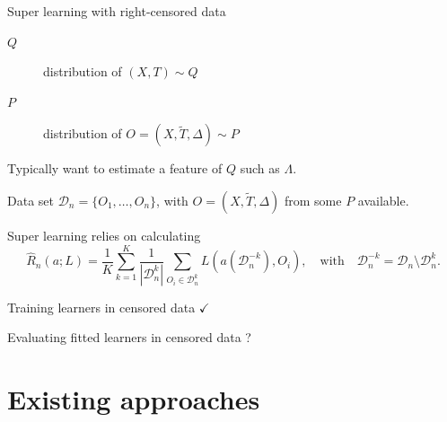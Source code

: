 \documentclass[smaller]{beamer}\usepackage{listings}
\begin{document}
\begin{frame}[label={sec:org34f21fb}]{Super learning with right-censored data}
\begin{description}
\item[{\(Q\)}] distribution of \((X, T) \sim Q\)
\item[{\color{darkgray}\(P\)\color{black}}] distribution of \(O = (X, \tilde T,
  \Delta) \sim P\)
\end{description}

\vfill

Typically want to estimate a feature of \(Q\) such as \(\Lambda\).

\vfill

Data set \(\mathcal{D}_n = \{O_1, \dots, O_n\}\), with \(O = (X, \tilde T,
\Delta)\) from some \(P\) available.

\vfill


Super learning relies on calculating
\begin{equation*}
  \hat{R}_n(a; L) =
  \frac{1}{K}\sum_{k=1}^{K}
  \frac{1}{| \mathcal{D}_n^{k} |}\sum_{O_i \in \mathcal{D}_n^{k}}
  L
  {
    \left(
      a{ (\mathcal{D}_n^{-k})}
      , O_i
    \right)
  },
  \quad \text{with} \quad
  \mathcal{D}_n^{-k} = \mathcal{D}_n \setminus \mathcal{D}_n^{k}.
\end{equation*}

\pause
\vfill

\begin{description}
\item[{\(a{ (\mathcal{D}_n^{-k})}\)}] Training learners in censored data
\(\checkmark\)
\item 

\item[{\(L(a{ (\mathcal{D}_n^{-k})} , O_i)\)}] Evaluating fitted learners in
censored data ?
\end{description}
\end{frame}


\section{Existing approaches}
\label{sec:org7380ceb}
\end{document}

